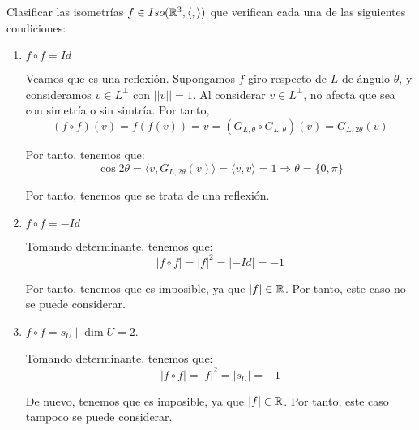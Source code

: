 \begin{ejercicio}
    Clasificar las isometrías $f\in Iso(\mathbb{R}^3, \langle,\rangle)$ que verifican cada una de las siguientes condiciones: 
    \begin{enumerate}
        \item $f\circ f=Id$

        Veamos que es una reflexión. Supongamos $f$ giro respecto de $L$ de ángulo $\theta$, y consideramos $v\in L^\perp$  con $||v||=1$. Al considerar $v\in L^\perp$, no afecta que sea con simetría o sin simtría. Por tanto,
        \begin{equation*}
            (f\circ f)(v)=f(f(v))=v=(G_{L,\theta}\circ G_{L,\theta})(v)
            = G_{L,2\theta}(v)
        \end{equation*}

        Por tanto, tenemos que:
        \begin{equation*}
            \cos 2\theta = \langle v,G_{L,2\theta}(v)\rangle = \langle v,v\rangle = 1\Longrightarrow \theta =\{0,\pi\}
        \end{equation*}

        Por tanto, tenemos que se trata de una reflexión.

        
        \item $f\circ f=-Id$

        Tomando determinante, tenemos que:
        \begin{equation*}
            |f\circ f| = |f|^2 = |-Id| = -1
        \end{equation*}

        Por tanto, tenemos que es imposible, ya que $|f|\in \mathbb{R}$. Por tanto, este caso no se puede considerar.
        
        \item $f\circ f=s_U \mid \dim U=2$.

        Tomando determinante, tenemos que:
        \begin{equation*}
            |f\circ f| = |f|^2 = |s_U| = -1
        \end{equation*}

        De nuevo, tenemos que es imposible, ya que $|f|\in \mathbb{R}$. Por tanto, este caso tampoco se puede considerar.
    \end{enumerate}
\end{ejercicio}


